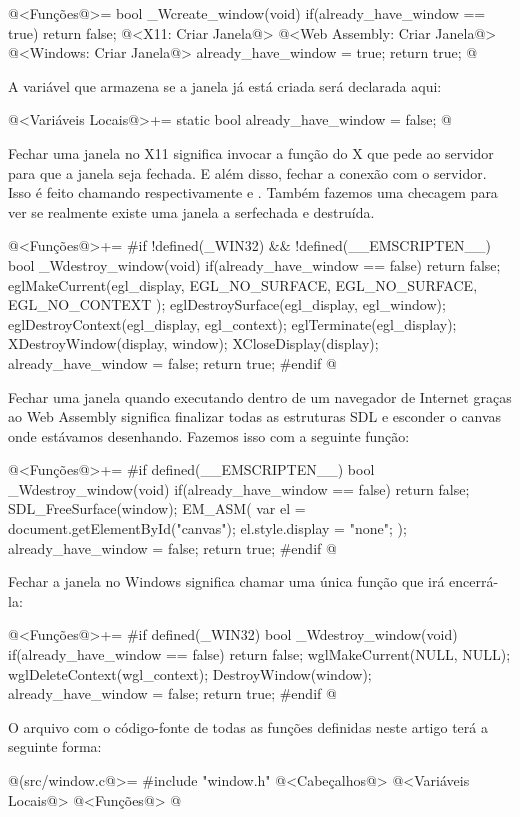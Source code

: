 \iniciocodigo
@<Funções@>=
bool _Wcreate_window(void){
  if(already_have_window == true)
    return false;
  @<X11: Criar Janela@>
  @<Web Assembly: Criar Janela@>
  @<Windows: Criar Janela@>
  already_have_window = true;
  return true;
}
@
\fimcodigo

A variável que armazena se a janela já está criada será declarada
aqui:

\iniciocodigo
@<Variáveis Locais@>+=
static bool already_have_window = false;
@
\fimcodigo


Fechar uma janela no X11 significa invocar a função do X que pede ao
servidor para que a janela seja fechada. E além disso, fechar a
conexão com o servidor. Isso é feito chamando
respectivamente 
e . Também fazemos uma checagem para ver se
realmente existe uma janela a serfechada e destruída.

\iniciocodigo
@<Funções@>+=
#if !defined(_WIN32) && !defined(__EMSCRIPTEN__)
bool _Wdestroy_window(void){
  if(already_have_window == false)
    return false;
  eglMakeCurrent(egl_display, EGL_NO_SURFACE, EGL_NO_SURFACE,
                 EGL_NO_CONTEXT );
  eglDestroySurface(egl_display, egl_window);
  eglDestroyContext(egl_display, egl_context);
  eglTerminate(egl_display);
  XDestroyWindow(display, window);
  XCloseDisplay(display);
  already_have_window = false;
  return true;
}
#endif
@
\fimcodigo


Fechar uma janela quando executando dentro de um navegador de Internet
graças ao Web Assembly significa finalizar todas as estruturas SDL e
esconder o canvas onde estávamos desenhando. Fazemos isso com a
seguinte função:

\iniciocodigo
@<Funções@>+=
#if defined(__EMSCRIPTEN__)
bool _Wdestroy_window(void){
  if(already_have_window == false)
    return false;
  SDL_FreeSurface(window);
  EM_ASM(
    var el = document.getElementById("canvas");
    el.style.display = "none";
  );
  already_have_window = false;
  return true;
}
#endif
@
\fimcodigo


Fechar a janela no Windows significa chamar uma única função que irá
encerrá-la:

\iniciocodigo
@<Funções@>+=
#if defined(_WIN32)
bool _Wdestroy_window(void){
  if(already_have_window == false)
    return false;
  wglMakeCurrent(NULL, NULL);
  wglDeleteContext(wgl_context);
  DestroyWindow(window);
  already_have_window = false;
  return true;
}
#endif
@
\fimcodigo



O arquivo com o código-fonte de todas as funções definidas neste
artigo terá a seguinte forma:

\iniciocodigo
@(src/window.c@>=
#include "window.h"
@<Cabeçalhos@>
@<Variáveis Locais@>
@<Funções@>
@
\fimcodigo


\fim
